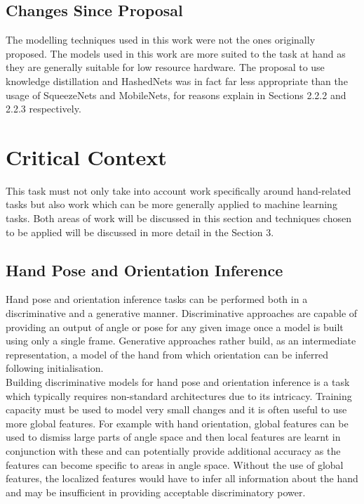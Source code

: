 \documentclass{article}
\begin{document}
\subsection{Changes Since Proposal}
The modelling techniques used in this work were not the ones originally proposed. The models used in this work are more suited to the task at hand as they are generally suitable for low resource hardware. The proposal to use knowledge distillation and HashedNets was in fact far less appropriate than the usage of SqueezeNets and MobileNets, for reasons explain in Sections 2.2.2 and 2.2.3 respectively.

\section{Critical Context}
This task must not only take into account work specifically around hand-related tasks but also work which can be more generally applied to machine learning tasks. Both areas of work will be discussed in this section and techniques chosen to be applied will be discussed in more detail in the Section 3.   

\subsection{Hand Pose and Orientation Inference}
Hand pose and orientation inference tasks can be performed both in a discriminative and a generative manner. Discriminative approaches are capable of providing an output of angle or pose for any given image once a model is built using only a single frame. Generative approaches rather build, as an intermediate representation, a model of the hand from which orientation can be inferred following initialisation.\\

Building discriminative models for hand pose and orientation inference is a task which typically requires non-standard architectures due to its intricacy. Training capacity must be used to model very small changes and it is often useful to use more global features. For example with hand orientation, global features can be used to dismiss large parts of angle space and then local features are learnt in conjunction with these and can potentially provide additional accuracy as the features can become specific to areas in angle space. Without the use of global features, the localized features would have to infer all information about the hand and may be insufficient in providing acceptable discriminatory power.\\
\end{document}
